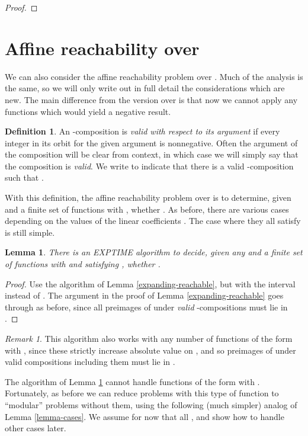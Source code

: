 \documentclass[11pt]{amsart}
\newtheorem{lemma}{Lemma}
\theoremstyle{definition}
\newtheorem*{definition}{Definition}
\theoremstyle{remark}
\newtheorem*{remark}{Remark}
\begin{document}
\begin{proof}
\end{proof}

\section{Affine reachability over } \label{reach-n}

We can also consider the affine reachability problem over . Much of the analysis is the same, so we will only write out in full detail the considerations which are new. The main difference from the version over  is that now we cannot apply any functions which would yield a negative result.
\begin{definition}
An -composition is \emph{valid with respect to its argument} if every integer in its orbit for the given argument is nonnegative. Often the argument of the composition will be clear from context, in which case we will simply say that the composition is \emph{valid}. We write  to indicate that there is a valid -composition  such that .
\end{definition}
With this definition, the affine reachability problem over  is to determine, given  and a finite set  of functions  with , whether . As before, there are various cases depending on the values of the linear coefficients . The case where they all satisfy  is still simple.
\begin{lemma} \label{n-expanding-reachable}
There is an \textsf{EXPTIME} algorithm to decide, given any  and a finite set  of functions  with  and satisfying , whether .
\end{lemma}
\begin{proof}
Use the algorithm of Lemma \ref{expanding-reachable}, but with the interval  instead of . The argument in the proof of Lemma \ref{expanding-reachable} goes through as before, since all preimages of  under \emph{valid} -compositions must lie in .
\end{proof}
\begin{remark}
This algorithm also works with any number of functions of the form  with , since these strictly increase absolute value on , and so preimages of  under valid compositions including them must lie in .
\end{remark}

The algorithm of Lemma \ref{n-expanding-reachable} cannot handle functions of the form  with . Fortunately, as before we can reduce problems with this type of function to ``modular'' problems without them, using the following (much simpler) analog of Lemma \ref{lemma-cases}. We assume for now that all , and show how to handle other cases later.
\end{document}
